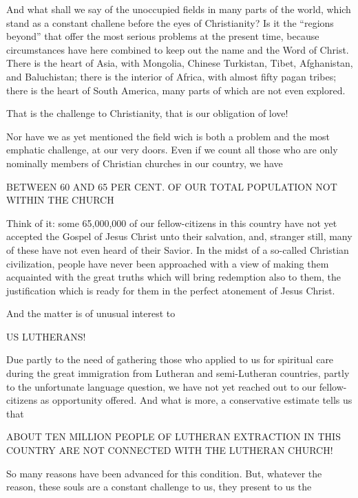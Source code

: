\documentclass[
]{book}
\begin{document}
And what shall we say of the unoccupied fields in many parts of the world, which stand as a constant challene before the eyes of Christianity? Is it the ``regions beyond'' that offer the most serious problems at the present time, because circumstances have here combined to keep out the name and the Word of Christ. There is the heart of Asia, with Mongolia, Chinese Turkistan, Tibet, Afghanistan, and Baluchistan; there is the interior of Africa, with almost fifty pagan tribes; there is the heart of South America, many parts of which are not even explored.

That is the challenge to Christianity, that is our obligation of love!

Nor have we as yet mentioned the field wich is both a problem and the most emphatic challenge, at our very doors. Even if we count all those who are only nominally members of Christian churches in our country, we have

\begin{center} BETWEEN 60 AND 65 PER CENT. OF OUR TOTAL POPULATION NOT WITHIN THE CHURCH \end{center}

Think of it: some 65,000,000 of our fellow-citizens in this country have not yet accepted the Gospel of Jesus Christ unto their salvation, and, stranger still, many of these have not even heard of their Savior. In the midst of a so-called Christian civilization, people have never been approached with a view of making them acquainted with the great truths which will bring redemption also to them, the justification which is ready for them in the perfect atonement of Jesus Christ.

And the matter is of unusual interest to

\begin{center} US LUTHERANS! \end{center}

Due partly to the need of gathering those who applied to us for spiritual care during the great immigration from Lutheran and semi-Lutheran countries, partly to the unfortunate language question, we have not yet reached out to our fellow-citizens as opportunity offered. And what is more, a conservative estimate tells us that

\begin{center} ABOUT TEN MILLION PEOPLE OF LUTHERAN EXTRACTION IN THIS COUNTRY ARE NOT CONNECTED WITH THE LUTHERAN CHURCH! \end{center}

So many reasons have been advanced for this condition. But, whatever the reason, these souls are a constant challenge to us, they present to us the
\end{document}
